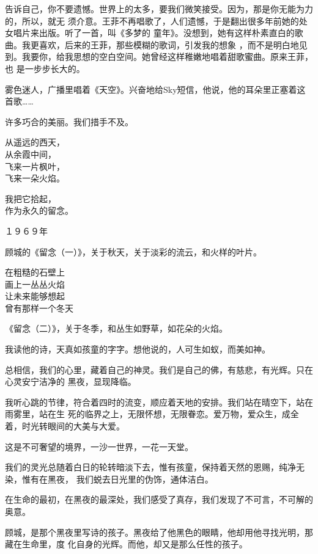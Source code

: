 \documentclass[12pt,a4paper]{article}
\begin{document}
		告诉自己，你不要遗憾。世界上的太多，要我们微笑接受。因为，那是你无能为力的，所以，就无
	须介意。王菲不再唱歌了，人们遗憾，于是翻出很多年前她的处女唱片来出版。听了一首，叫《多梦的
	童年》。没想到，她有这样朴素直白的歌曲。我更喜欢，后来的王菲，那些模糊的歌词，引发我的想象
	，而不是明白地见到。我要你，给我思想的空白空间。她曾经这样稚嫩地唱着甜歌蜜曲。原来王菲，也
	是一步步长大的。


		雾色迷人，广播里唱着《天空》。兴奋地给Sky短信，他说，他的耳朵里正塞着这首歌……

		许多巧合的美丽。我们措手不及。

	\endwriting



		\longpoem{}{}{}
		从遥远的西天，\\
		从余霞中间，\\
		飞来一片枫叶，\\
		飞来一朵火焰。

		我把它拾起，\\
		作为永久的留念。

		\flushright １９６９年
		\endlongpoem

		顾城的《留念（一）》，关于秋天，关于淡彩的流云，和火样的叶片。

		\longpoem{}{}{}
		在粗糙的石壁上 \\
		画上一丛丛火焰 \\
		让未来能够想起 \\
		曾有那样一个冬天
		\endlongpoem

		《留念（二）》，关于冬季，和丛生如野草，如花朵的火焰。

		我读他的诗，天真如孩童的字字。想他说的，人可生如蚁，而美如神。

		总相信，我们的心里，藏着自己的神灵。我们是自己的佛，有慈悲，有光辉。只在心灵安宁洁净的
	黑夜，显现降临。

		我听心跳的节律，符合着四时的流变，顺应着天地的安排。我们站在晴空下，站在雨雾里，站在生
	死的临界之上，无限怀想，无限眷恋。爱万物，爱众生，成全着，时光转眼间的大美与大爱。

		这是不可奢望的境界，一沙一世界，一花一天堂。

		我们的灵光总随着白日的轮转暗淡下去，惟有孩童，保持着天然的恩赐，纯净无染，惟有在黑夜，
	我们蜕去日光里的伪饰，通体洁白。

		在生命的最初，在黑夜的最深处，我们感受了真存，我们发现了不可言，不可解的奥意。

		顾城，是那个黑夜里写诗的孩子。黑夜给了他黑色的眼睛，他却用他寻找光明，那藏在生命里，度
	化自身的光辉。而他，却又是那么任性的孩子。
\end{document}

